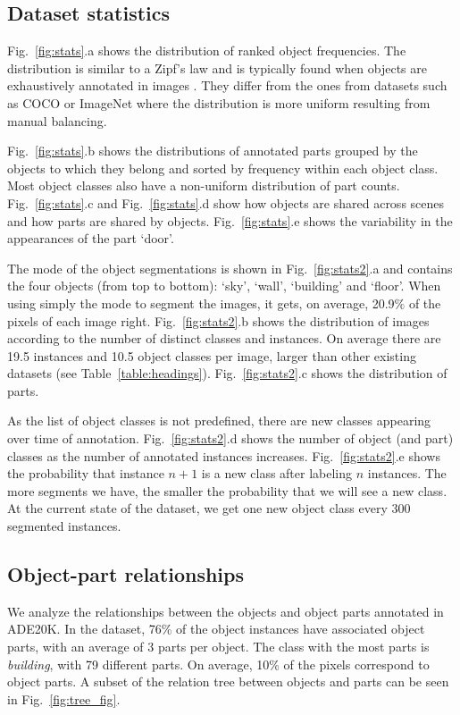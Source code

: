 \subsection{Dataset statistics}

Fig.~\ref{fig:stats}.a shows the distribution of ranked object frequencies. The distribution is similar to a Zipf's law and is typically found when objects are exhaustively annotated in images \citep{spainPerona10,xiao2010sun}. They differ from the ones from datasets such as COCO or ImageNet where the distribution is more uniform resulting from manual balancing.

Fig.~\ref{fig:stats}.b shows the distributions of annotated parts grouped by the objects to which they belong and sorted by frequency within each object class. Most object classes also have a non-uniform distribution of part counts. Fig.~\ref{fig:stats}.c and Fig.~\ref{fig:stats}.d show how objects are shared across scenes and how parts are shared by objects. Fig.~\ref{fig:stats}.e shows the variability in the appearances of the part `door'.

The mode of the object segmentations is shown in Fig.~\ref{fig:stats2}.a and contains the four objects (from top to bottom): `sky', `wall', `building' and `floor'. When using simply the mode to segment the images, it gets, on average, 20.9$\%$ of the pixels of each image right. Fig.~\ref{fig:stats2}.b shows the distribution of images according to the number of distinct classes and instances. On average there are 19.5 instances and 10.5 object classes per image, larger than other existing datasets (see Table~\ref{table:headings}). Fig.~\ref{fig:stats2}.c shows the distribution of parts. 

As the list of object classes is not predefined, there are new classes appearing over time of annotation. Fig.~\ref{fig:stats2}.d shows the number of object (and part) classes as the number of annotated instances increases. Fig.~\ref{fig:stats2}.e shows the probability that instance $n+1$ is a new class after labeling $n$ instances. The more segments we have, the smaller the probability that we will see a new class. At the current state of the dataset, we get one new object class every 300 segmented instances. 

\subsection{Object-part relationships} We analyze the relationships between the objects and object parts annotated in ADE20K. In the dataset, 76\% of the object instances have associated object parts, with an average of 3 parts per object. The class with the most parts is \textit{building}, with 79 different parts. On average, 10\% of the pixels correspond to object parts. A subset of the relation tree between objects and parts can be seen in Fig.~\ref{fig:tree_fig}. 

